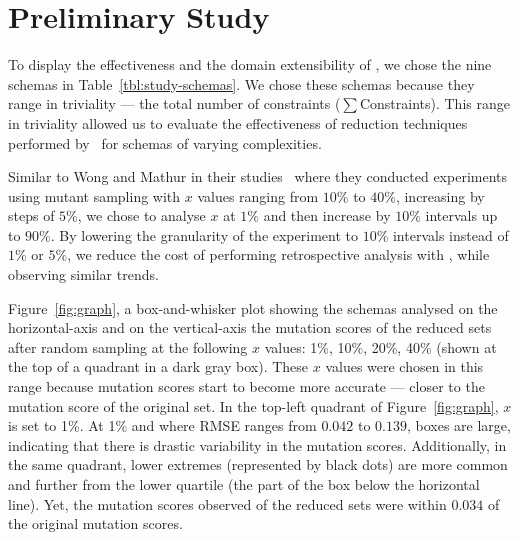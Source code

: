 \section{Preliminary Study}




To display the effectiveness and the domain extensibility of \mr, we chose the nine schemas in Table~\ref{tbl:study-schemas}.
We chose these schemas because they range in triviality --- the total number of constraints ({\small$\sum$Constraints}).
This range in triviality allowed us to evaluate the effectiveness of reduction techniques performed by \mr~for schemas of varying
complexities.

Similar to Wong and Mathur in their studies~\cite{mathur1994empirical, wong1993mutation} where they conducted experiments using
mutant sampling with $x$ values ranging from $10\%$ to $40\%$, increasing by steps of $5\%$, we chose to analyse $x$ at $1\%$ and
then increase by $10\%$ intervals up to $90\%$. By lowering the granularity of the experiment to $10\%$ intervals instead of $1\%$
or $5\%$, we reduce the cost of performing retrospective analysis with \mr, while observing similar trends.




Figure~\ref{fig:graph}, a box-and-whisker plot showing the schemas analysed on the horizontal-axis and on the vertical-axis the
mutation scores of the reduced sets after random sampling at the following $x$ values: 1\%, 10\%, 20\%, 40\% (shown at the top
of a quadrant in a dark gray box). These $x$ values were chosen in this range because mutation scores start to become more accurate ---
closer to the mutation score of the original set. In the top-left quadrant of Figure~\ref{fig:graph}, $x$ is set to 1\%. At 1\% and
where RMSE ranges from $0.042$ to $0.139$, boxes are large, indicating that there is drastic variability in the mutation scores.
Additionally, in the same quadrant, lower extremes (represented by black dots) are more common and further from the lower quartile (the part
of the box below the horizontal line). Yet, the mutation scores observed of the reduced sets were
within $0.034$ of the original mutation scores.

